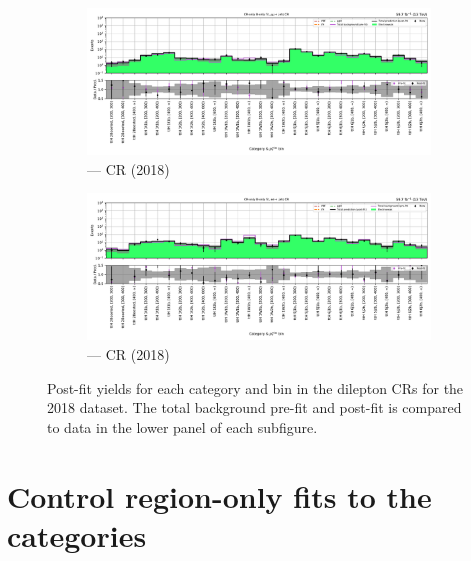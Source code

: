 \begin{figure}[htbp]
    \centering
    \begin{subfigure}[b]{\textwidth}
        \includegraphics[width=\textwidth]{chapters/higgstoinv/figures/mountain_ranges/2018/ttH/Zmumu_tree_fit_b-abs_values_ttH_cats.pdf}
        \caption{\ttH --- \doubleMuCr \gls{CR} (2018)}
    \end{subfigure}

    \begin{subfigure}[b]{\textwidth}
        \includegraphics[width=\textwidth]{chapters/higgstoinv/figures/mountain_ranges/2018/ttH/Zee_tree_fit_b-abs_values_ttH_cats.pdf}
        \caption{\ttH --- \doubleEleCr \gls{CR} (2018)}
    \end{subfigure}
    \caption[Post-fit yields for each \ttH category and \ptmiss bin in the dilepton control regions for the 2018 dataset]{Post-fit yields for each \ttH category and \ptmiss bin in the dilepton \glspl{CR} for the 2018 dataset. The total background pre-fit and post-fit is compared to data in the lower panel of each subfigure.}
    \label{fig:htoinv_mountain_range_ttH_2018_dilep_CRs}
\end{figure}

\clearpage




\section{Control region-only fits to the \texorpdfstring{\VH}{VH} categories}
\label{sec:pre_post_fit_plots_VH_CRs}


